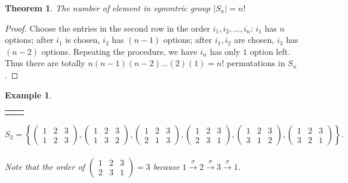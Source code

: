 \documentclass{article}
\theoremstyle{MyNonumberplain}
\theoremstyle{break}
\newtheorem*{proof}{Proof. }
\newcommand{\nline}{\begin{tabular}{ll}&\\\end{tabular}}
\theoremstyle{break}
\newtheorem{theorem}{Theorem}[section]
\newtheorem{example}{Example}[section]
\theoremstyle{break}
\theoremstyle{definition}
\theoremstyle{break}
\begin{document}
\begin{thmbox}
    \begin{theorem}
        The number of element in symmtric group $| S_n | = n!$
    \end{theorem}
    \begin{prfbox}
        \begin{proof}
            Choose the entries in the second row in the order $i_1, i_2, \ldots, i_n$:
            $i_1$ has $n$ options; after $i_1$ is chosen, $i_2$ has $(n - 1)$ options;
            after $i_1, i_2$ are chosen, $i_3$ has $(n - 2)$ options. Repeating the
            procedure, we have $i_n$ has only $1$ option left. Thus there are totally $n
            (n - 1) (n - 2) \ldots (2) (1) = n!$ permutations in $S_n$.
        \end{proof}
    \end{prfbox}
\end{thmbox}
\begin{expbox}
    \begin{example}

        \nline


        $S_3 = \left\{ \left(\begin{array}{ccc}
            1 & 2 & 3\\
            1 & 2 & 3
          \end{array}\right), \left(\begin{array}{ccc}
            1 & 2 & 3\\
            1 & 3 & 2
          \end{array}\right), \left(\begin{array}{ccc}
            1 & 2 & 3\\
            2 & 1 & 3
          \end{array}\right), \left(\begin{array}{ccc}
            1 & 2 & 3\\
            2 & 3 & 1
          \end{array}\right), \left(\begin{array}{ccc}
            1 & 2 & 3\\
            3 & 1 & 2
          \end{array}\right), \left(\begin{array}{ccc}
            1 & 2 & 3\\
            3 & 2 & 1
          \end{array}\right) \right\} .$\\\\

          Note that the order of $\left(\begin{array}{ccc}
            1 & 2 & 3\\
            2 & 3 & 1
          \end{array}\right) = 3$ because $1 \xrightarrow{\sigma} 2 \xrightarrow{\sigma}
          3 \xrightarrow{\sigma} 1$.
    \end{example}
\end{expbox}
\end{document}

